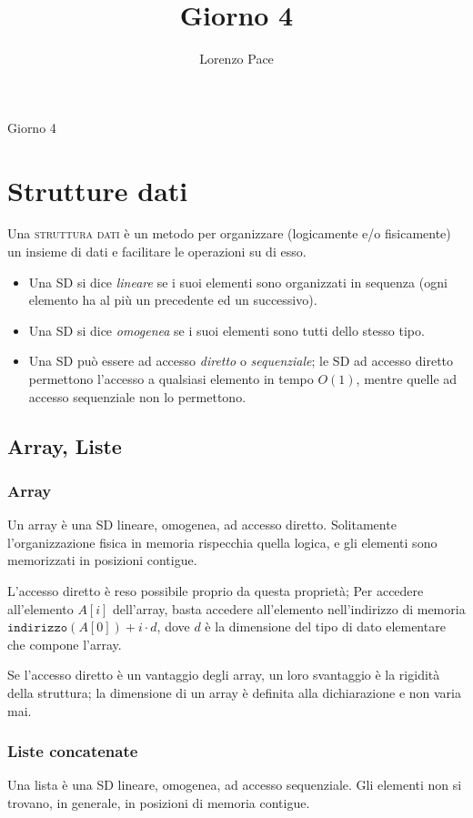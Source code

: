 \documentclass[a4paper,10pt]{article}
\title{Giorno 4}
\author{Lorenzo Pace}
\theoremstyle{definition}
\begin{document}
\begin{center}
    \LARGE Giorno 4
\end{center}

\section{Strutture dati}
Una \textsc{struttura dati} è un metodo per organizzare (logicamente e/o fisicamente) un insieme di dati e facilitare le operazioni su di esso.
\begin{itemize}
 \item Una SD si dice \emph{lineare} se i suoi elementi sono organizzati in sequenza (ogni elemento ha al più un precedente ed un successivo). 
 \item Una SD si dice \emph{omogenea} se i suoi elementi sono tutti dello stesso tipo.
 \item Una SD può essere ad accesso \emph{diretto} o \emph{sequenziale}; le SD ad accesso diretto permettono l'accesso a qualsiasi elemento in tempo $O(1)$, mentre quelle ad accesso sequenziale non lo permettono.
\end{itemize}

\subsection{Array, Liste}
\subsubsection{Array}
Un array è una SD lineare, omogenea, ad accesso diretto. Solitamente l'organizzazione fisica in memoria rispecchia quella logica, e gli elementi sono memorizzati in posizioni contigue.\smallskip

L'accesso diretto è reso possibile proprio da questa proprietà; Per accedere all'elemento $A[i]$ dell'array, basta accedere all'elemento nell'indirizzo di memoria $\texttt{indirizzo}(A[0]) + i \cdot d$, dove $d$ è la dimensione del tipo di dato elementare che compone l'array.\smallskip

Se l'accesso diretto è un vantaggio degli array, un loro svantaggio è la rigidità della struttura; la dimensione di un array è definita alla dichiarazione e non varia mai.

\subsubsection{Liste concatenate}
Una lista è una SD lineare, omogenea, ad accesso sequenziale.
Gli elementi non si trovano, in generale, in posizioni di memoria contigue.\smallskip
\end{document}
